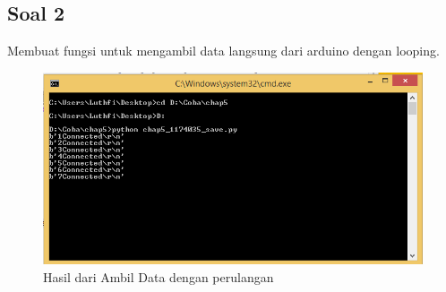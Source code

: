 	\subsection{Soal 2}
	Membuat fungsi untuk mengambil data langsung dari arduino dengan looping. 
	
	\begin{figure}[H]
		\includegraphics[width=12cm]{figures/5/1174035/Praktek/ReadLoop.png}
		\centering
		\caption{Hasil dari Ambil Data dengan perulangan}
	\end{figure}
